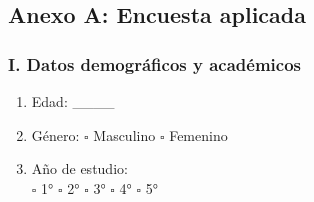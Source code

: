 \documentclass[12pt, a4paper]{article}
\begin{document}
\newpage
\printbibliography

\newpage
\appendix
{}

\subsection*{Anexo A: Encuesta aplicada}

\subsubsection*{I. Datos demográficos y académicos}
\begin{enumerate}[label=\arabic*.]
    \item Edad: \_\_\_\_
    \item Género: \hspace{1em} $\square$ Masculino \hspace{1em} $\square$ Femenino
    \item Año de estudio: \\ $\square$ 1° \hspace{1em}  $\square$ 2° 
    \hspace{1em}  $\square$ 3° \hspace{1em} 
         $\square$ 4° \hspace{1em} 
         $\square$ 5°

\end{enumerate}
\end{document}
